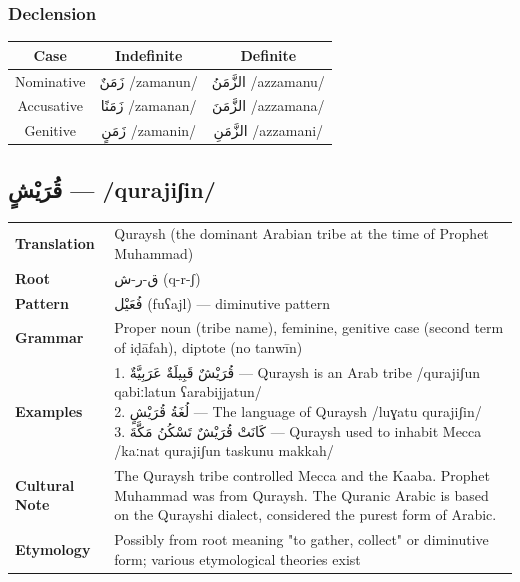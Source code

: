 \documentclass[letterpaper,12pt]{article}
\begin{document}
\subsubsection*{Declension}
\begin{tabular}{|c|c|c|}
\hline
\textbf{Case} & \textbf{Indefinite} & \textbf{Definite} \\
\hline
Nominative & \textarabic{زَمَنٌ} /zamanun/ & \textarabic{الزَّمَنُ} /azzamanu/ \\
\hline
Accusative & \textarabic{زَمَنًا} /zamanan/ & \textarabic{الزَّمَنَ} /azzamana/ \\
\hline
Genitive & \textarabic{زَمَنٍ} /zamanin/ & \textarabic{الزَّمَنِ} /azzamani/ \\
\hline
\end{tabular}

\subsection{\textarabic{قُرَيْشٍ} — /qurajiʃin/}
\begin{tabular}{p{3cm}p{10cm}}
\toprule
\textbf{Translation} & Quraysh (the dominant Arabian tribe at the time of Prophet Muhammad) \\
\textbf{Root} & \textarabic{ق-ر-ش} (q-r-ʃ) \\
\textbf{Pattern} & \textarabic{فُعَيْل} (fuʕajl) — diminutive pattern \\
\textbf{Grammar} & Proper noun (tribe name), feminine, genitive case (second term of iḍāfah), diptote (no tanwīn) \\
\midrule
\textbf{Examples} & \makecell[l]{\parbox{9.5cm}{
1. \textarabic{قُرَيْشٌ قَبِيلَةٌ عَرَبِيَّةٌ} — Quraysh is an Arab tribe /qurajiʃun qabiːlatun ʕarabijjatun/\\
2. \textarabic{لُغَةُ قُرَيْشٍ} — The language of Quraysh /luɣatu qurajiʃin/\\
3. \textarabic{كَانَتْ قُرَيْشٌ تَسْكُنُ مَكَّةَ} — Quraysh used to inhabit Mecca /kaːnat qurajiʃun taskunu makkah/
}} \\
\midrule
\textbf{Cultural Note} & The Quraysh tribe controlled Mecca and the Kaaba. Prophet Muhammad was from Quraysh. The Quranic Arabic is based on the Qurayshi dialect, considered the purest form of Arabic. \\
\textbf{Etymology} & Possibly from root meaning "to gather, collect" or diminutive form; various etymological theories exist \\
\bottomrule
\end{tabular}
\end{document}
